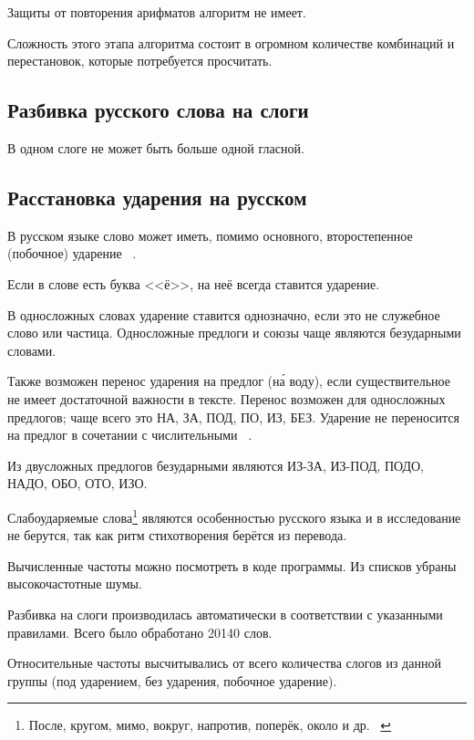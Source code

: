 Защиты от повторения арифматов алгоритм не имеет.


Сложность этого этапа алгоритма состоит в огромном количестве комбинаций и перестановок, которые потребуется просчитать.

\subsection{Разбивка русского слова на слоги}

В одном слоге не может быть больше одной гласной.

\subsection{Расстановка ударения на русском}

В русском языке слово может иметь, помимо основного, второстепенное (побочное) ударение ~\cite{udar}.

Если в слове есть буква <<ё>>, на неё всегда ставится ударение.

В односложных словах ударение ставится однозначно, если это не служебное слово или частица. Односложные предлоги и союзы чаще являются безударными словами.

Также возможен перенос ударения на предлог (н\'{а} воду), если существительное не имеет достаточной важности в тексте. Перенос возможен для односложных предлогов; чаще всего это НА, ЗА, ПОД, ПО, ИЗ, БЕЗ. Ударение не переносится на предлог в сочетании с числительными ~\cite{orfo}.

Из двусложных предлогов безударными являются ИЗ-ЗА, ИЗ-ПОД, ПОДО, НАДО, ОБО, ОТО, ИЗО.

Слабоударяемые слова\footnote{После, кругом, мимо, вокруг, напротив, поперёк, около и др. ~\cite{rosental}} являются особенностью русского языка и в исследование не берутся, так как ритм стихотворения берётся из перевода.

Вычисленные частоты можно посмотреть в коде программы. Из списков убраны высокочастотные шумы.

Разбивка на слоги производилась автоматически в соответствии с указанными правилами. Всего было обработано 20140 слов.

Относительные частоты высчитывались от всего количества слогов из данной группы (под ударением, без ударения, побочное ударение).
